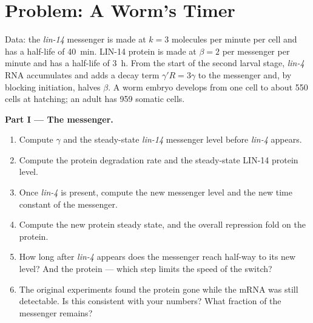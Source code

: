 \section{Problem: A Worm's Timer}

\begin{problem}
\label{pb:b3:rna-regulation:1}
Data: the \emph{lin-14} messenger is made at $k = 3$ molecules per
minute per cell and has a half-life of \qty{40}{min}. LIN-14 protein is
made at $\beta = 2$ per messenger per minute and has a half-life of
\qty{3}{h}. From the start of the second larval stage, \emph{lin-4}
RNA accumulates and adds a decay term $\gamma' R = 3\gamma$ to the
messenger and, by blocking initiation, halves $\beta$. A worm embryo
develops from one cell to about \num{550} cells at hatching; an adult
has \num{959} somatic cells.

\medskip
\noindent\textbf{Part I --- The messenger.}
\begin{enumerate}
  \item Compute $\gamma$ and the steady-state \emph{lin-14} messenger
        level before \emph{lin-4} appears.
  \item Compute the protein degradation rate and the steady-state
        LIN-14 protein level.
  \item Once \emph{lin-4} is present, compute the new messenger level
        and the new time constant of the messenger.
  \item Compute the new protein steady state, and the overall
        repression fold on the protein.
  \item How long after \emph{lin-4} appears does the messenger reach
        half-way to its new level? And the protein --- which step
        limits the speed of the switch?
  \item The original experiments found the protein gone while the mRNA
        was still detectable. Is this consistent with your numbers?
        What fraction of the messenger remains?
\end{enumerate}


\end{problem}
